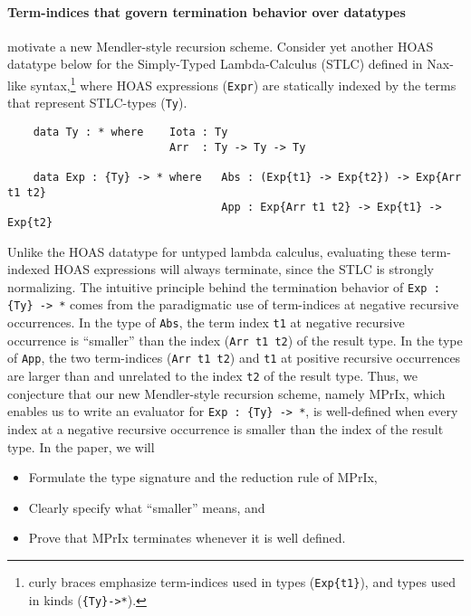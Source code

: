 \documentclass[a4paper]{easychair} %
\begin{document}
\paragraph{Term-indices that govern termination behavior over datatypes\!\!\!}
motivate a new Mendler-style recursion scheme.
Consider yet another HOAS datatype below for the Simply-Typed Lambda-Calculus (STLC)
defined in Nax-like syntax,\footnote{curly braces emphasize
  term-indices used in types (\texttt{Exp\{t1\}}),
  and types used in kinds (\texttt{\{Ty\}\;->\;*}).}
where HOAS expressions (\texttt{Expr}) are
statically indexed by the terms that represent STLC-types (\texttt{Ty}).
\begin{verbatim}
    data Ty : * where    Iota : Ty
                         Arr  : Ty -> Ty -> Ty

    data Exp : {Ty} -> * where   Abs : (Exp{t1} -> Exp{t2}) -> Exp{Arr t1 t2}
                                 App : Exp{Arr t1 t2} -> Exp{t1} -> Exp{t2}
\end{verbatim}
Unlike the HOAS datatype for untyped lambda calculus, evaluating
these term-indexed HOAS expressions will always terminate,
since the STLC is strongly normalizing.
The intuitive principle behind the termination behavior of \texttt{Exp\,:\,\{Ty\}\,->\,*}
comes from the paradigmatic use of term-indices at negative recursive occurrences.  
In the type of \texttt{Abs}, the term index \texttt{t1}
at negative recursive occurrence is ``smaller'' than the index
(\texttt{Arr t1 t2}) of the result type. In the type of \texttt{App},
the two term-indices (\texttt{Arr t1 t2}) and \texttt{t1} at positive recursive
occurrences are larger than and unrelated to the index \texttt{t2} of the result type.
Thus, we conjecture that our new Mendler-style recursion scheme, namely \textsf{MPrIx},
which enables us to write an evaluator for  \texttt{Exp\,:\,\{Ty\}\,->\,*}, 
is well-defined when every index at a negative recursive occurrence is
smaller than the index of the result type.
In the paper, we will \vspace*{-1ex}
\begin{itemize}
 \item Formulate the type signature and the reduction rule of \textsf{MPrIx},
 \vspace*{-1ex}
 \item Clearly specify what ``smaller'' means, and
 \vspace*{-1ex}
 \item Prove that \textsf{MPrIx} terminates whenever it is well defined.
\end{itemize}
\end{document}
